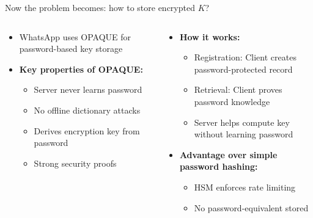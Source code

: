 \documentclass[aspectratio=169, lualatex, handout]{beamer}
\begin{document}
\begin{frame}{Now the problem becomes: how to store encrypted $K$?}
	\begin{columns}[c]
		\begin{column}{0.5\textwidth}
			\begin{itemize}
				\item WhatsApp uses OPAQUE for password-based key storage
				\item \textbf{Key properties of OPAQUE:}
				      \begin{itemize}
					      \item Server never learns password
					      \item No offline dictionary attacks
					      \item Derives encryption key from password
					      \item Strong security proofs
				      \end{itemize}
			\end{itemize}
		\end{column}
		\begin{column}{0.5\textwidth}
			\begin{itemize}
				\item \textbf{How it works:}
				      \begin{itemize}
					      \item Registration: Client creates password-protected record
					      \item Retrieval: Client proves password knowledge
					      \item Server helps compute key without learning password
				      \end{itemize}
				\item \textbf{Advantage over simple password hashing:}
				      \begin{itemize}
					      \item HSM enforces rate limiting
					      \item No password-equivalent stored
				      \end{itemize}
			\end{itemize}
		\end{column}
	\end{columns}
\end{frame}
\end{document}
